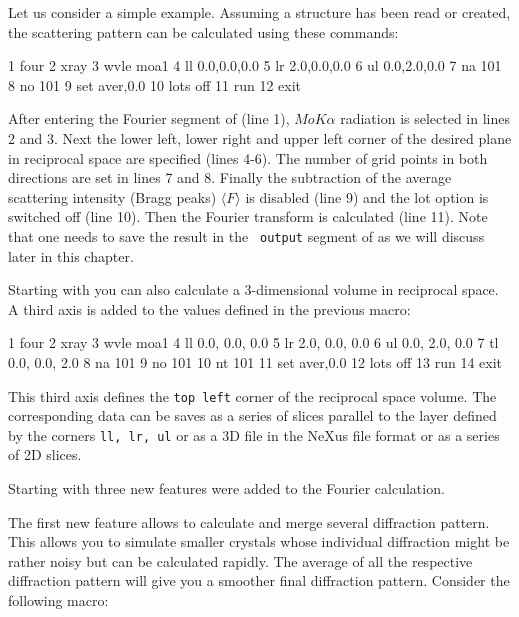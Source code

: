 Let us consider a simple example. Assuming a structure has been read
or created, the scattering pattern can be calculated using these
commands:

\begin{MacVerbatim}
     1  four
     2    xray
     3    wvle moa1
     4    ll 0.0,0.0,0.0
     5    lr 2.0,0.0,0.0
     6    ul 0.0,2.0,0.0
     7    na 101
     8    no 101
     9    set aver,0.0
    10    lots off
    11    run
    12  exit
\end{MacVerbatim}

After entering the Fourier segment of {\Discus} (line 1),
$MoK\alpha$ radiation is selected in lines 2 and 3. Next the lower
left, lower right and upper left corner of the desired plane in
reciprocal space are specified (lines 4-6). The number of grid
points in both directions are set in lines 7 and 8. Finally the
subtraction of the average scattering intensity (Bragg peaks)
$\langle F \rangle$ is disabled (line 9) and the lot option is
switched off (line 10). Then the Fourier transform is calculated
(line 11). Note that one needs to save the result in the {\tt
output} segment of {\Discus} as we will discuss later in this
chapter.
\par
Starting with  you can also calculate a 3-dimensional 
volume in reciprocal space. A third axis is added to the 
values defined in the previous macro:

\begin{MacVerbatim}
     1  four
     2    xray
     3    wvle moa1
     4    ll 0.0, 0.0, 0.0
     5    lr 2.0, 0.0, 0.0
     6    ul 0.0, 2.0, 0.0
     7    tl 0.0, 0.0, 2.0
     8    na 101
     9    no 101
    10    nt 101
    11    set aver,0.0
    12    lots off
    13    run
    14  exit
\end{MacVerbatim}

This third axis defines the {\tt top left} corner of the reciprocal
space volume. The corresponding data can be saves as a series of slices
parallel to the layer defined by the corners {\tt ll, lr, ul} or as a
3D file in the NeXus file format or as a series of 2D slices.

Starting with  three new features were added to the Fourier
calculation.

The first new feature allows to calculate and merge several diffraction 
pattern. This allows you to simulate smaller crystals whose individual 
diffraction might be rather noisy but can be calculated rapidly. The
average of all the respective diffraction pattern will give you a smoother
final diffraction pattern. Consider the following macro:

